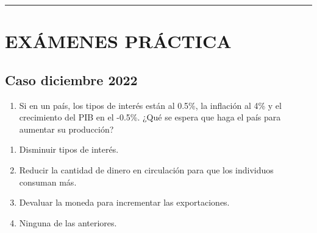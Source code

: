 \documentclass[
  letterpaper,
  DIV=11,
  numbers=noendperiod]{scrreprt}
\providecommand{\tightlist}{%
  \setlength{\itemsep}{0pt}\setlength{\parskip}{0pt}}\usepackage{longtable,booktabs,array}
\begin{document}
\begin{center}\rule{0.5\linewidth}{0.5pt}\end{center}

\part{EXÁMENES PRÁCTICA}

\hypertarget{caso-diciembre-2022}{%
\chapter*{Caso diciembre 2022}\label{caso-diciembre-2022}}


\begin{enumerate}
\def\labelenumi{\arabic{enumi}.}
\tightlist
\item
  Si en un país, los tipos de interés están al 0.5\%, la inflación al
  4\% y el crecimiento del PIB en el -0.5\%. ¿Qué se espera que haga el
  país para aumentar su producción?
\end{enumerate}

\begin{enumerate}
\def\labelenumi{\alph{enumi})}
\item
  Disminuir tipos de interés.
\item
  Reducir la cantidad de dinero en circulación para que los individuos
  consuman más.
\item
  Devaluar la moneda para incrementar las exportaciones.
\item
  Ninguna de las anteriores.
\end{enumerate}
\end{document}
